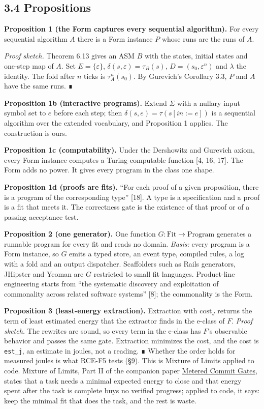 \documentclass[10pt,letterpaper]{article}
\begin{document}
\subsection{3.4 Propositions}\label{propositions}

\textbf{Proposition 1 (the Form captures every sequential algorithm).}
For every sequential algorithm \(A\) there is a Form instance \(P\)
whose runs are the runs of \(A\).

\emph{Proof sketch.} Theorem 6.13 gives an ASM \(B\) with the states,
initial states and one-step map of \(A\). Set \(E = \{\varepsilon\}\),
\(\delta(s, \varepsilon) = \tau_B(s)\), \(D = (s_0, \varepsilon^n)\) and
\(\lambda\) the identity. The fold after \(n\) ticks is
\(\tau_A^n(s_0)\). By Gurevich's Corollary 3.3, \(P\) and \(A\) have the
same runs. ∎

\textbf{Proposition 1b (interactive programs).} Extend \(\Sigma\) with a
nullary input symbol set to \(e\) before each step; then
\(\delta(s, e) = \tau(s[\mathit{in} := e])\) is a sequential algorithm
over the extended vocabulary, and Proposition 1 applies. The
construction is ours.

\textbf{Proposition 1c (computability).} Under the Dershowitz and
Gurevich axiom, every Form instance computes a Turing-computable
function {[}4, 16, 17{]}. The Form adds no power. It gives every program
in the class one shape.

\textbf{Proposition 1d (proofs are fits).} ``For each proof of a given
proposition, there is a program of the corresponding type'' {[}18{]}. A
type is a specification and a proof is a fit that meets it. The
correctness gate is the existence of that proof or of a passing
acceptance test.

\textbf{Proposition 2 (one generator).} One function
\(G : \mathrm{Fit} \to \mathrm{Program}\) generates a runnable program
for every fit and reads no domain. \emph{Basis:} every program is a Form
instance, so \(G\) emits a typed store, an event type, compiled rules, a
log with a fold and an output dispatcher. Scaffolders such as Rails
generators, JHipster and Yeoman are \(G\) restricted to small fit
languages. Product-line engineering starts from ``the systematic
discovery and exploitation of commonality across related software
systems'' {[}8{]}; the commonality is the Form.

\textbf{Proposition 3 (least-energy extraction).} Extraction with
\(\mathrm{cost}_J\) returns the term of least estimated energy that the
extractor finds in the e-class of \(F\). \emph{Proof sketch.} The
rewrites are sound, so every term in the e-class has \(F\)'s observable
behavior and passes the same gate. Extraction minimizes the cost, and
the cost is \texttt{est\_j}, an estimate in joules, not a reading. ∎
Whether the order holds for measured joules is what RCE-F5 tests
(\href{https://research.openie.dev/papers/rce/\#9-falsifiers}{§9}). This
is Mixture of Limits applied to code. Mixture of Limits, Part II of the
companion paper \href{https://research.openie.dev/papers/gates/}{Metered
Commit Gates}, states that a task needs a minimal expected energy to
close and that energy spent after the task is complete buys no verified
progress; applied to code, it says: keep the minimal fit that does the
task, and the rest is waste.
\end{document}
